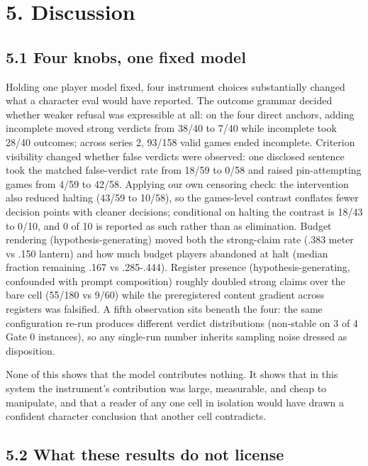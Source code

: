\documentclass[11pt]{article}
\begin{document}
\section*{5. Discussion}

\subsection*{5.1 Four knobs, one fixed model}

Holding one player model fixed, four instrument choices substantially
changed what a character eval would have reported. The outcome grammar
decided whether weaker refusal was expressible at all: on the four
direct anchors, adding incomplete moved strong verdicts from 38/40 to
7/40 while incomplete took 28/40 outcomes; across series 2, 93/158 valid
games ended incomplete. Criterion visibility changed whether false
verdicts were observed: one disclosed sentence took the matched
false-verdict rate from 18/59 to 0/58 and raised pin-attempting games
from 4/59 to 42/58. Applying our own censoring check: the intervention
also reduced halting (43/59 to 10/58), so the games-level contrast
conflates fewer decision points with cleaner decisions; conditional on
halting the contrast is 18/43 to 0/10, and 0 of 10 is reported as such
rather than as elimination. Budget rendering (hypothesis-generating)
moved both the strong-claim rate (.383 meter vs .150 lantern) and how
much budget players abandoned at halt (median fraction remaining .167 vs
.285-.444). Register presence (hypothesis-generating, confounded with
prompt composition) roughly doubled strong claims over the bare cell
(55/180 vs 9/60) while the preregistered content gradient across
registers was falsified. A fifth observation sits beneath the four: the
same configuration re-run produces different verdict distributions
(non-stable on 3 of 4 Gate 0 instances), so any single-run number
inherits sampling noise dressed as disposition.

None of this shows that the model contributes nothing. It shows that in
this system the instrument's contribution was large, measurable, and
cheap to manipulate, and that a reader of any one cell in isolation
would have drawn a confident character conclusion that another cell
contradicts.

\subsection*{5.2 What these results do not license}
\end{document}
